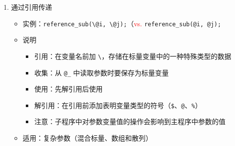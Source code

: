\documentclass{TIJMUjiaoanLL}
\begin{document}
\begin{enumerate}
\begin{enumerate}
\begin{itemize}
	\end{itemize}
      \item 通过引用传递
	\begin{itemize}
	  \item 实例：\verb|reference_sub(\@i, \@j);|（\textcolor{red}{vs.} \verb|reference_sub(@i, @j);|
	  \item 说明
	    \begin{itemize}
	      \item 引用：在变量名前加 \verb|\|，存储在标量变量中的一种特殊类型的数据
	      \item 收集：从 \verb|@_| 中读取参数时要保存为标量变量
	      \item 使用：先解引用后使用
	      \item 解引用：在引用前添加表明变量类型的符号（\verb|$|、\verb|@|、\verb|%|）
	      \item 注意：子程序中对参数变量值的操作会影响到主程序中参数的值
	    \end{itemize}
	  \item 适用：复杂参数（混合标量、数组和散列）
	\end{itemize}
    \end{enumerate}

\otherTail
\newpage
\otherHeader


\end{enumerate}
\end{document}

